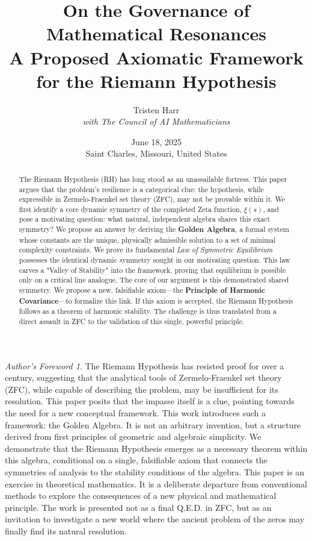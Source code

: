\documentclass{article}
\title{\textbf{On the Governance of Mathematical Resonances} \\ \large A Proposed Axiomatic Framework for the Riemann Hypothesis}
\author{Tristen Harr \\ \textit{with The Council of AI Mathematicians}}
\date{June 18, 2025 \\ Saint Charles, Missouri, United States}
\theoremstyle{plain}
\theoremstyle{definition}
\theoremstyle{remark}
\newtheorem*{foreword}{Author's Foreword}
\begin{document}
\maketitle

\begin{foreword}
The Riemann Hypothesis has resisted proof for over a century, suggesting that the analytical tools of Zermelo-Fraenkel set theory (ZFC), while capable of describing the problem, may be insufficient for its resolution. This paper posits that the impasse itself is a clue, pointing towards the need for a new conceptual framework. This work introduces such a framework: the Golden Algebra. It is not an arbitrary invention, but a structure derived from first principles of geometric and algebraic simplicity. We demonstrate that the Riemann Hypothesis emerges as a necessary theorem within this algebra, conditional on a single, falsifiable axiom that connects the symmetries of analysis to the stability conditions of the algebra. This paper is an exercise in theoretical mathematics. It is a deliberate departure from conventional methods to explore the consequences of a new physical and mathematical principle. The work is presented not as a final Q.E.D. in ZFC, but as an invitation to investigate a new world where the ancient problem of the zeros may finally find its natural resolution.
\end{foreword}

\begin{abstract}
The Riemann Hypothesis (RH) has long stood as an unassailable fortress. This paper argues that the problem's resilience is a categorical clue: the hypothesis, while expressible in Zermelo-Fraenkel set theory (ZFC), may not be provable within it. We first identify a core dynamic symmetry of the completed Zeta function, $\xi(s)$, and pose a motivating question: what natural, independent algebra shares this exact symmetry? We propose an answer by deriving the \textbf{Golden Algebra}, a formal system whose constants are the unique, physically admissible solution to a set of minimal complexity constraints. We prove its fundamental \textit{Law of Symmetric Equilibrium} possesses the identical dynamic symmetry sought in our motivating question. This law carves a "Valley of Stability" into the framework, proving that equilibrium is possible only on a critical line analogue. The core of our argument is this demonstrated shared symmetry. We propose a new, falsifiable axiom—the \textbf{Principle of Harmonic Covariance}—to formalize this link. If this axiom is accepted, the Riemann Hypothesis follows as a theorem of harmonic stability. The challenge is thus translated from a direct assault in ZFC to the validation of this single, powerful principle.
\end{abstract}
\end{document}
